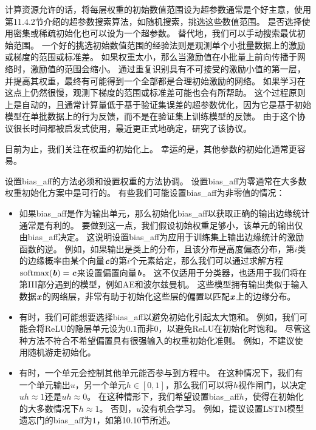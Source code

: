 计算资源允许的话，将每层权重的初始数值范围设为超参数通常是个好主意，使用第11.4.2节介绍的超参数搜索算法，如随机搜索，挑选这些数值范围。
是否选择使用密集或稀疏初始化也可以设为一个超参数。
替代地，我们可以手动搜索最优初始范围。
一个好的挑选初始数值范围的经验法则是观测单个小批量数据上的激励或梯度的范围或标准差。
如果权重太小，那么当激励值在小批量上前向传播于网络时，激励值的范围会缩小。
通过重复识别具有不可接受的激励小值的第一层，并提高其权重，最终有可能得到一个全部都是合理初始激励的网络。
如果学习在这点上仍然很慢，观测下梯度的范围或标准差可能也会有所帮助。
这个过程原则上是自动的，且通常计算量低于基于验证集误差的超参数优化，因为它是基于初始模型在单批数据上的行为反馈，而不是在验证集上训练模型的反馈。
由于这个协议很长时间都被启发式使用，最近\cite{mishkin2015all}更正式地确定，研究了该协议。

目前为止，我们关注在权重的初始化上。
幸运的是，其他参数的初始化通常更容易。


设置\gls{bias_aff}的方法必须和设置权重的方法协调。
设置\gls{bias_aff}为零通常在大多数权重初始化方案中是可行的。
有些我们可能设置\gls{bias_aff}为非零值的情况：
\begin{itemize}
\item 如果\gls{bias_aff}是作为输出单元，那么初始化\gls{bias_aff}以获取正确的输出边缘统计通常是有利的。
要做到这一点，我们假设初始权重足够小，该单元的输出仅由\gls{bias_aff}决定。
这说明设置\gls{bias_aff}为应用于训练集上输出边缘统计的激励函数的逆。
例如，如果输出是类上的分布，且该分布是高度偏态分布，第$i$类的边缘概率由某个向量$\boldsymbol{\mathit{c}}$的第$i$个元素给定，那么我们可以通过求解方程$\text{softmax}(\boldsymbol{\mathit{b}})=\boldsymbol{\mathit{c}}$来设置偏置向量$\boldsymbol{\mathit{b}}$。
这不仅适用于分类器，也适用于我们将在第III部分遇到的模型，例如\gls{AE}和波尔兹曼机。
这些模型拥有输出类似于输入数据$\boldsymbol{\mathit{x}}$的网络层，非常有助于初始化这些层的偏置以匹配$\boldsymbol{\mathit{x}}$上的边缘分布。

\item 有时，我们可能想要选择\gls{bias_aff}以避免初始化引起太大饱和。
例如，我们可能会将ReLU的隐层单元设为$0.1$而非$0$，以避免ReLU在初始化时饱和。
尽管这种方法不符合不希望偏置具有很强输入的权重初始化准则。
例如，不建议使用随机游走初始化\citep{Sussillo14}。

\item 有时，一个单元会控制其他单元能否参与到方程中。
在这种情况下，我们有一个单元输出$u$，另一个单元$h\in[0,1]$，那么我们可以将$h$视作闸门，以决定$uh\approx 1$还是$uh\approx 0$。
在这种情形下，我们希望设置\gls{bias_aff}$h$，使得在初始化的大多数情况下$h\approx 1$。
否则，$u$没有机会学习。
例如，\cite{Jozefowicz-et-al-ICML2015}提议设置LSTM模型遗忘门的\gls{bias_aff}为$1$，如第10.10节所述。
\end{itemize}


